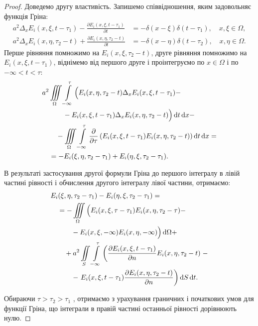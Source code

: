 \begin{proof}
	Доведемо другу властивість. Запишемо співвідношення, яким задовольняє функція Гріна:
	\begin{align}
		a^2 \Delta_x E_i(x, \xi, t - \tau_1) - \frac{\partial E_i(x, \xi, t - \tau_1)}{\partial t} &= - \delta(x - \xi) \delta (t - \tau_1), \quad x, \xi \in \Omega, \\
		a^2 \Delta_x E_i(x, \eta, \tau_2 - t) + \frac{\partial E_i(x, \eta, \tau_2 - t)}{\partial t} &= - \delta(x - \eta) \delta (t - \tau_2), \quad x, \eta \in \Omega.
	\end{align}
	Перше рівняння помножимо на $E_i(x, \xi, \tau_2 - t)$, друге рівняння помножимо на $E_i(x, \xi, t - \tau_1)$, віднімемо від першого друге і проінтегруємо по $x \in \Omega$ і по $-\infty < t < \tau$:
	\begin{equation}
		\begin{aligned}
			& a^2 \displaystyle\iiint\limits_\Omega \displaystyle\int\limits_{-\infty}^\tau \Big( E_i(x, \eta, \tau_2 - t) \Delta_x E_i(x, \xi, t - \tau_1) - \\
			& \qquad \quad - E_i(x, \xi, t - \tau_1) \Delta_x E_i(x, \eta, \tau_2 - t) \Big) \mathop{}\!\mathrm{d} t \mathop{}\!\mathrm{d} x - \\
			& \qquad - \displaystyle\iiint\limits_\Omega \displaystyle\int\limits_{-\infty}^\tau \frac{\partial}{\partial \tau} \left( E_i(x, \xi, t - \tau_1) E_i(x, \eta, \tau_2 - t) \right) \mathop{}\!\mathrm{d} t \mathop{}\!\mathrm{d} x = \\
			& \quad = - E_i(\xi, \eta, \tau_2 - \tau_1) + E_i(\eta, \xi, \tau_2 - \tau_1).
		\end{aligned}
	\end{equation}

	В результаті застосування другої формули Гріна до першого інтегралу в лівій частині рівності і обчислення другого інтегралу лівої частини, отримаємо:
	\begin{equation}
		\begin{aligned}
			& E_i(\xi, \eta, \tau_2 - \tau_1 ) - E_i(\eta, \xi, \tau_2 - \tau_1) = \\
			& \quad = - \displaystyle\iiint\limits_\Omega \Big( E_i(x, \xi, \tau - \tau_1) E_i(x, \eta, \tau_2 - \tau) - \\
			& \qquad \quad - E_i(x, \xi, -\infty) E_i(x, \eta, -\infty) \Big) \mathop{}\!\mathrm{d} \Omega + \\
			& \qquad + a^2 \displaystyle\iint\limits_S \displaystyle\int\limits_{-\infty}^\tau \left( \frac{\partial E_i(x, \xi, t - \tau_1)}{\partial n} E_i(x, \eta, \tau_2 - t) \right. - \\
			& \qquad \quad - \left. E_i(x, \xi, t - \tau_1) \frac{\partial E_i(x, \eta, \tau_2 - t)}{\partial n} \right) \mathop{}\!\mathrm{d} S \mathop{}\!\mathrm{d} t.
		\end{aligned}
	\end{equation}

	Обираючи $\tau > \tau_2 > \tau_1$ , отримаємо з урахування граничних і початкових умов для функції Гріна, що інтеграли в правій частині останньої рівності дорівнюють нулю.
\end{proof}

